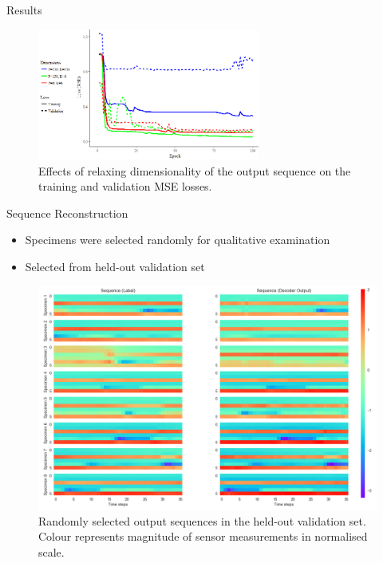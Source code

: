 \documentclass{beamer}
\begin{document}
\begin{frame}{Results}
  \begin{figure}[h]
  	\centering
  	\includegraphics[width=0.65\textwidth]{output_dims.png}
  	\caption{Effects of relaxing dimensionality of the output sequence on the training and validation MSE losses.}
  \end{figure}
\end{frame}

\begin{frame}[shrink]{Sequence Reconstruction}
  \begin{itemize}
    \item Specimens were selected randomly for qualitative examination
    \item Selected from held-out validation set
  \end{itemize}
  \begin{figure}[H]
  	\centering
  	\includegraphics[width=1\textwidth]{heatmaps.png}
  	\caption{Randomly selected output sequences in the held-out validation set. Colour represents magnitude of sensor measurements in normalised scale.}
  \end{figure}
\end{frame}
\end{document}
